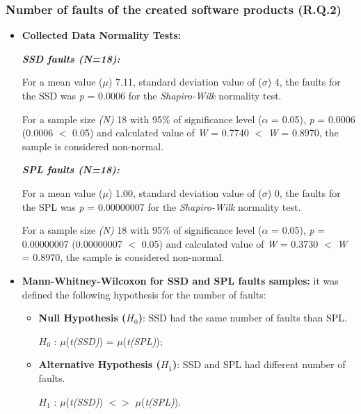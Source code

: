 



\subsubsection{Number of faults of the created software products (R.Q.2)}


\begin{itemize}

\item \textbf{Collected Data Normality Tests:} 

\textbf{\textit{SSD faults (\textit{N}=18):}}

For a mean value ($\mu$) 7.11, standard deviation value of ($\sigma$) 4, the faults for the SSD was \textit{p} = 0.0006 for the \textit{Shapiro-Wilk} normality test.

For a sample size \textit{(N)} 18 with 95\% of significance level ($\alpha$ = 0.05), \textit{p} = 0.0006 (0.0006 $<$ 0.05) and calculated value of \textit{W} = 0.7740 $<$ \textit{W} = 0.8970, the sample is considered non-normal.



\textbf{\textit{SPL faults (\textit{N}=18):}}

For a mean value ($\mu$) 1.00, standard deviation value of ($\sigma$) 0, the faults for the SPL was \textit{p} = 0.00000007 for the \textit{Shapiro-Wilk} normality test.

For a sample size \textit{(N)} 18 with 95\% of significance level ($\alpha$ = 0.05), \textit{p} = 0.00000007 (0.00000007 $<$ 0.05) and calculated value of \textit{W} = 0.3730 $<$ \textit{W} = 0.8970, the sample is considered non-normal.





\item \textbf{Mann-Whitney-Wilcoxon for SSD and SPL faults samples:} it was defined the following hypothesis for the number of faults:


\begin{itemize}
  \item \textbf{Null Hypothesis ($H_{0}$)}: SSD had the same number of faults than SPL.	
	
	$H_{0}$ : $\mu$(\textit{t(SSD)}) = $\mu$(\textit{t(SPL)}); 
	
	\item \textbf{Alternative  Hypothesis ($H_{1}$)}: SSD and SPL had different number of faults.	
	
	$H_{1}$ :  $\mu$(\textit{t(SSD)}) $<>$ $\mu$(\textit{t(SPL)}).


\end{itemize}
\end{itemize}
